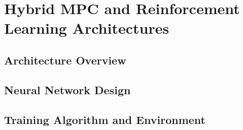 \section{Hybrid MPC and Reinforcement Learning Architectures}

\subsection{Architecture Overview}

\subsection{Neural Network Design}

\subsection{Training Algorithm and Environment}
\label{subsec:tita_training_environment}
